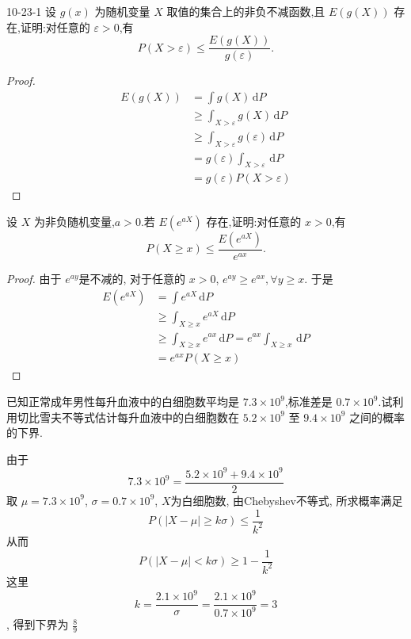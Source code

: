 \documentclass[../main.tex]{subfiles}
\begin{document}
\begin{exercise}{}{10-23-1}
设 $g(x)$ 为随机变量 $X$ 取值的集合上的非负不减函数,且 $E(g(X))$ 存在,证明:对任意的 $\varepsilon>0$,有
\begin{equation}
P(X > \varepsilon) \leqslant \frac{E(g(X))}{g(\varepsilon)}.
\end{equation}
\end{exercise}
 \begin{proof}
    \[
    \begin{aligned}
    E\left( g\left( X \right)  \right)&= \int g\left( X \right)\,\mathrm{d} P\\ 
     &\ge \int_{ X>  \varepsilon } g\left( X \right)\,\mathrm{d} P    \\ 
      &\ge \int_{X>  \varepsilon }g\left(  \varepsilon  \right) \,\mathrm{d} P\\ 
       &= g\left(  \varepsilon  \right)\int_{X>  \varepsilon }\,\mathrm{d} P\\ 
        &= g\left(  \varepsilon  \right)P\left( X>  \varepsilon  \right)   
    \end{aligned}
    \]
 \end{proof}
\begin{exercise}{}{}
设 $X$ 为非负随机变量,$a>0$.若 $E(e^{aX})$ 存在,证明:对任意的 $x>0$,有
\begin{equation}
P(X \geqslant x) \leqslant \frac{E(e^{aX})}{e^{ax}}.
\end{equation}
\end{exercise}
\begin{proof}
由于 \(  e^{ay}  \)是不减的, 对于任意的 \(x> 0 \), \(  e^{ay}\ge e^{ax}, \forall y\ge x  \). 于是       \[
    \begin{aligned}
  E\left( e^{aX} \right)&= \int e^{aX}\,\mathrm{d} P \\ 
   &\ge \int_{X\ge x} e^{aX}\,\mathrm{d} P\\ 
    &\ge  \int_{X\ge x}e^{a x}\,\mathrm{d} P= e^{ax} \int_{X\ge x}\,\mathrm{d} P\\ 
     &= e^{ax} P\left( X\ge x \right) 
    \end{aligned}
    \]
\end{proof}
\begin{exercise}{}{}
已知正常成年男性每升血液中的白细胞数平均是 $7.3\times10^9$,标准差是 $0.7\times10^9$.试利用切比雪夫不等式估计每升血液中的白细胞数在 $5.2\times10^9$ 至 $9.4\times10^9$ 之间的概率的下界.
\end{exercise}
\begin{solution}
       由于 \[
    7.3\times 10^{9}= \frac{5.2\times 10^{9}+ 9.4\times 10^{9} }{2 } 
    \]取 \(  \mu = 7.3\times 10^{9}  \), \(   \sigma = 0.7\times 10^{9}  \), \(  X  \)为白细胞数,  由Chebyshev不等式, 所求概率满足   
    $$P(|X - \mu| \geq k\sigma) \leq \frac{1}{k^2}$$从而 \[
   P\left( \left| X-\mu  \right|< k  \sigma   \right)\ge 1-\frac{1 }{k^{2} }  
   \]这里 \[
   k= \frac{2.1\times 10^{9} }{ \sigma  }= \frac{2.1\times 10^{9} }{0.7\times 10^{9} }= 3  
   \], 得到下界为 \(  \frac{8 }{9 }   \)  
\end{solution}
\end{document}
